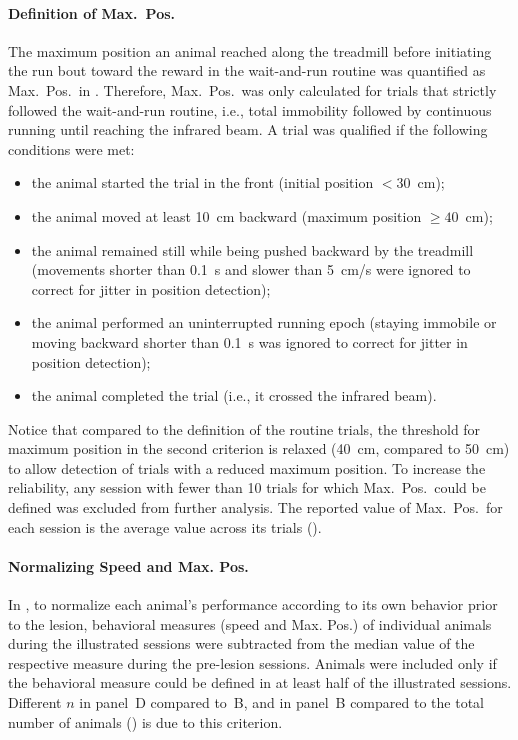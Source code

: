 \paragraph{Definition of Max.\ Pos.}
The maximum position an animal reached along the treadmill before initiating the run bout toward the reward in the wait-and-run routine was quantified as Max.\ Pos.\ in .
Therefore, Max.\ Pos.\ was only calculated for trials that strictly followed the wait-and-run routine, i.e., total immobility followed by continuous running until reaching the infrared beam.
A trial was qualified if the following conditions were met:
\begin{itemize}[noitemsep]
    \item the animal started the trial in the front (initial position $< 30$~cm);
    \item the animal moved at least 10~cm backward (maximum position $\geq 40$~cm);
    \item the animal remained still while being pushed backward by the treadmill (movements shorter than 0.1~s and slower than 5~cm/s were ignored to correct for jitter in position detection);
    \item the animal performed an uninterrupted running epoch (staying immobile or moving backward shorter than 0.1~s was ignored to correct for jitter in position detection);
    \item the animal completed the trial (i.e., it crossed the infrared beam).
\end{itemize}
Notice that compared to the definition of the routine trials, the threshold for maximum position in the second criterion is relaxed (40~cm, compared to 50~cm) to allow detection of trials with a reduced maximum position.
To increase the reliability, any session with fewer than 10 trials for which Max.\ Pos.\ could be defined was excluded from further analysis.
The reported value of Max.\ Pos.\ for each session is the average value across its trials ().


\paragraph{Normalizing Speed and Max. Pos.}
In , to normalize each animal’s performance according to its own behavior prior to the lesion, behavioral measures (speed and Max. Pos.) of individual animals during the illustrated sessions were subtracted from the median value of the respective measure during the pre-lesion sessions.
Animals were included only if the behavioral measure could be defined in at least half of the illustrated sessions.
Different $n$ in panel~D compared to~B, and in panel~B compared to the total number of animals () is due to this criterion.